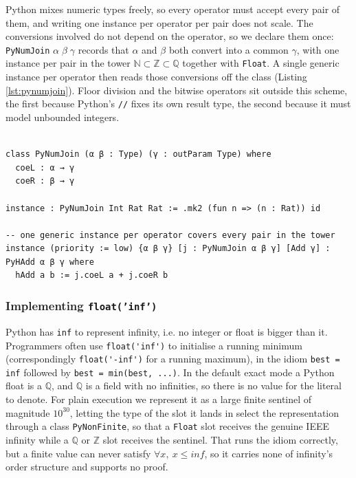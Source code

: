 \documentclass{article}
\newcommand{\code}{\lstinline}
\begin{document}
Python mixes numeric types freely, so every operator must accept every pair of them, and writing one instance per operator per pair does not scale. The conversions involved do not depend on the operator, so we declare them once: \texttt{PyNumJoin} $\alpha\;\beta\;\gamma$ records that $\alpha$ and $\beta$ both convert into a common $\gamma$, with one instance per pair in the tower $\mathbb{N} \subset \mathbb{Z} \subset \mathbb{Q}$ together with \texttt{Float}. A single generic instance per operator then reads those conversions off the class (Listing \ref{lst:pynumjoin}). Floor division and the bitwise operators sit outside this scheme, the first because Python's \texttt{//} fixes its own result type, the second because it must model unbounded integers.

\begin{lstlisting}[style=lean,caption={The numeric tower, declared once and lifted to every operator.},label={lst:pynumjoin}]

class PyNumJoin (α β : Type) (γ : outParam Type) where
  coeL : α → γ
  coeR : β → γ

instance : PyNumJoin Int Rat Rat := .mk2 (fun n => (n : Rat)) id

-- one generic instance per operator covers every pair in the tower
instance (priority := low) {α β γ} [j : PyNumJoin α β γ] [Add γ] : PyHAdd α β γ where
  hAdd a b := j.coeL a + j.coeR b
\end{lstlisting}

\subsubsection{Implementing \texttt{float('inf')}} \label{floatinf}

Python has \code{inf} to represent infinity, i.e. no integer or float is bigger than it. Programmers often use \code{float('inf')} to initialise a running minimum (correspondingly \code{float('-inf')} for a running maximum), in the idiom \code{best = inf} followed by \code{best = min(best, ...)}. In the default exact mode a Python float is a $\mathbb{Q}$, and $\mathbb{Q}$ is a field with no infinities, so there is no value for the literal to denote. For plain execution we represent it as a large finite sentinel of magnitude $10^{30}$, letting the type of the slot it lands in select the representation through a class \code{PyNonFinite}, so that a \code{Float} slot receives the genuine IEEE infinity while a $\mathbb{Q}$ or $\mathbb{Z}$ slot receives the sentinel. That runs the idiom correctly, but a finite value can never satisfy $\forall x,\ x \le \mathit{inf}$, so it carries none of infinity's order structure and supports no proof.
\end{document}
